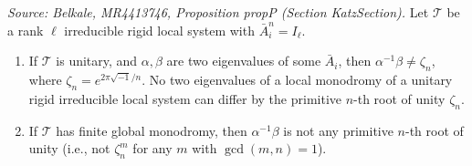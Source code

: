 \begin{proposition}[PropertyP]
  \label{prop:property-p}
  \textit{Source: Belkale, MR4413746, Proposition propP (Section KatzSection).}
  Let \(\mathcal{T}\) be a rank \(\ell\) irreducible rigid local system with \(\bar{A}_i^n = I_\ell\).
  \begin{enumerate}
    \item If \(\mathcal{T}\) is unitary, and \(\alpha, \beta\) are two eigenvalues of some \(\bar{A}_i\), then \(\alpha^{-1}\beta \neq \zeta_n\), where \(\zeta_n = e^{2\pi\sqrt{-1}/n}\). No two eigenvalues of a local monodromy of a unitary rigid irreducible local system can differ by the primitive \(n\)-th root of unity \(\zeta_n\).
    \item If \(\mathcal{T}\) has finite global monodromy, then \(\alpha^{-1}\beta\) is not any primitive \(n\)-th root of unity (i.e., not \(\zeta_n^m\) for any \(m\) with \(\gcd(m,n)=1\)).
  \end{enumerate}
\end{proposition}

